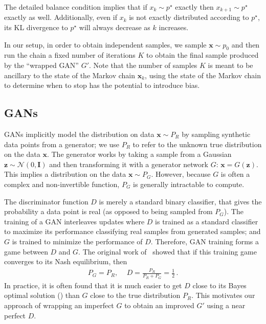 \documentclass{article}
\renewcommand{\vec}[1]{{\boldsymbol{\mathbf{#1}}}} %
\newcommand{\mat}[1]{{\ensuremath{\mathbf{#1}}}} %
\newcommand{\sample}{\sim}
\newcommand{\norm}{\mathcal{N}}
\newcommand{\target}{{p^\star}}
\newcommand{\pinit}{{p_0}}
\begin{document}
The detailed balance condition implies that if $x_k \sample \target$ exactly then $x_{k+1} \sample \target$ exactly as well.
Additionally, even if $x_k$ is not exactly distributed according to $\target$, its KL divergence to $\target$ will always decrease as $k$ increases.  %

In our setup, in order to obtain independent samples, we sample $\vec x \sample \pinit$ and then run the chain a fixed number of iterations $K$ to obtain the final sample produced by the ``wrapped GAN'' $G'$.
Note that the number of samples $K$ is meant to be ancillary to the state of the Markov chain $\vec x_k$, using the state of the Markov chain to determine when to stop has the potential to introduce bias.  %

\subsection{GANs}

GANs implicitly model the distribution on data $\vec x \sample P_R$ by sampling synthetic data points from a generator; we use $P_R$ to refer to the unknown true distribution on the data $\vec x$.
The generator works by taking a sample from a Gaussian $\vec z \sample \norm(0,\mat I)$ and then transforming it with a generator network $G$: $\vec x = G(\vec z)$.
This implies a distribution on the data $\vec x \sample P_G$.  %
However, because $G$ is often a complex and non-invertible function, $P_G$ is generally intractable to compute.

The discriminator function $D$ is merely a standard binary classifier, that gives the probability a data point is real (as opposed to being sampled from $P_G$)\@.
The training of a GAN interleaves updates where $D$ is trained as a standard classifier to maximize its performance classifying real samples from generated samples; and $G$ is trained to minimize the performance of $D$.
Therefore, GAN training forms a game between $D$ and $G$.
The original work of~\citet{} showed that if this training game converges to its Nash equilibrium, then
\begin{align}
  P_G = P_R,\, \quad D = \frac{P_R}{P_R + P_G} = \frac{1}{2}\,.
\end{align}
In practice, it is often found that it is much easier to get $D$ close to its Bayes optimal solution () than $G$ close to the true distribution $P_R$.
This motivates our approach of wrapping an imperfect $G$ to obtain an improved $G'$ using a near perfect $D$.
\end{document}
